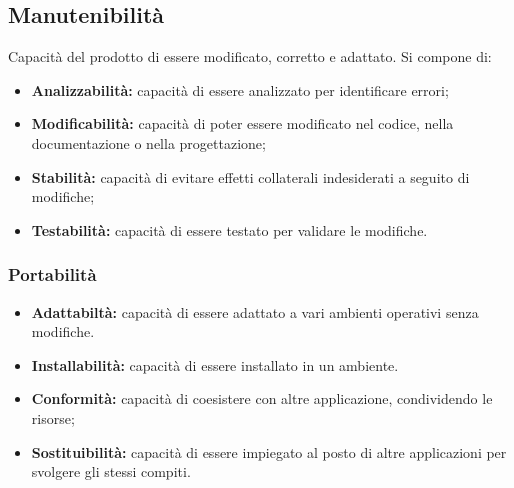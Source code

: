 \subsection{Manutenibilit\`a}
Capacit\`a del prodotto di essere modificato, corretto e adattato. Si compone di:
\begin{itemize}
    \item \textbf{Analizzabilit\`a: }capacit\`a di essere analizzato per identificare errori;
    \item \textbf{Modificabilit\`a: }capacit\`a di poter essere modificato nel codice, nella documentazione o nella progettazione;
    \item \textbf{Stabilit\`a: }capacit\`a di evitare effetti collaterali indesiderati a seguito di modifiche;
    \item \textbf{Testabilit\`a: }capacit\`a di essere testato per validare le modifiche.
\end{itemize}
\subsubsection{Portabilit\`a}
\begin{itemize}
    \item \textbf{Adattabilt\`a: }capacit\`a di essere adattato a vari ambienti operativi senza modifiche.
    \item \textbf{Installabilit\`a: }capacit\`a di essere installato in un ambiente.
    \item \textbf{Conformit\`a: }capacit\`a di coesistere con altre applicazione, condividendo le risorse;
    \item \textbf{Sostituibilit\`a: }capacit\`a di essere impiegato al posto di altre applicazioni per svolgere gli stessi compiti.
\end{itemize}